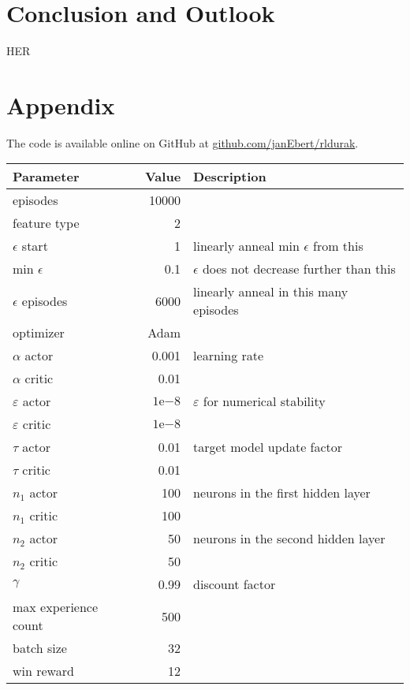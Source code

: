 \documentclass[a4paper,titlepage]{article}
\newcommand{\expn}[2]{{#1}\mathrm{e}{#2}}
\begin{document}
\section{Conclusion and Outlook}

HER \cite{her}

\newpage

\section{Appendix}
\label{sec:appendix}

The code is available online on GitHub at \url{github.com/janEbert/rldurak}. \bigskip

\begin{table}[h]
\centering
  \begin{tabular}{lrl}
    \toprule
    Parameter & Value & Description \\
    \midrule
    episodes & 10000 \\
    feature type & 2 \\
    $\epsilon$ start & 1 & linearly anneal min $\epsilon$ from this\\
    min $\epsilon$ & 0.1 & $\epsilon$ does not decrease further than this \\
    $\epsilon$ episodes & 6000 & linearly anneal in this many episodes \\
    optimizer & Adam \\
    $\alpha$ actor & 0.001 & learning rate \\
    $\alpha$ critic & 0.01 \\
    $\varepsilon$ actor & $\expn{1}{-8}$ & $\varepsilon$ for numerical stability \\
    $\varepsilon$ critic & $\expn{1}{-8}$ \\
    $\tau$ actor & 0.01 & target model update factor \\
    $\tau$ critic & 0.01 \\
    $n_1$ actor & 100 & neurons in the first hidden layer \\
    $n_1$ critic & 100 \\
    $n_2$ actor & 50 & neurons in the second hidden layer \\
    $n_2$ critic & 50 \\
    $\gamma$ & 0.99 & discount factor \\
    max experience count & 500 \\
    batch size & 32 \\
    win reward & 12 \\

\end{tabular}
\end{table}
\end{document}
